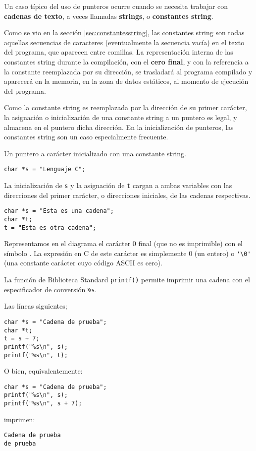 Un caso típico del uso de punteros ocurre cuando se necesita
trabajar con \textbf{cadenas de texto}, a veces llamadas \textbf{strings}, o \textbf{constantes string}. 

Como se vio en la sección \ref{sec:constantesstring}, las constantes string son todas aquellas secuencias de caracteres (eventualmente la secuencia vacía) en el texto del programa, que aparecen entre comillas. La representación interna de las constantes string durante la compilación, con el \textbf{cero final}, y con la referencia a la constante reemplazada por su dirección, se trasladará al programa compilado y aparecerá en la memoria, en la zona de datos estáticos, al momento de ejecución del programa. 

Como la constante string es reemplazada por la dirección de su primer carácter, la asignación o inicialización de una constante string a un puntero es legal, y almacena en el puntero dicha dirección. En la inicialización de punteros, las constantes string son un caso especialmente frecuente.

\begin{ejemplo}
Un puntero a carácter inicializado con una constante string.
\begin{lstlisting}
char *s = "Lenguaje C";
\end{lstlisting}
\end{ejemplo}

\begin{ejemplo}
La inicialización
de \texttt{s} y la asignación de \texttt{t} cargan a ambas variables con las direcciones del primer
carácter, o direcciones iniciales, de las cadenas respectivas.
\begin{lstlisting}
char *s = "Esta es una cadena";
char *t;
t = "Esta es otra cadena";
\end{lstlisting}
\end{ejemplo}

Representamos en el diagrama el carácter 0 final (que no es imprimible) con el
símbolo \textcurrency. La expresión en C de este carácter es simplemente 0 (un entero) o
\lstinline{'\0'} (una constante carácter cuyo código ASCII es cero).

La función de Biblioteca Standard \lstinline{printf()} permite imprimir una cadena con el
especificador de conversión \lstinline{%s}.

\begin{ejemplo}
Las líneas siguientes;
\begin{lstlisting}
char *s = "Cadena de prueba";
char *t;
t = s + 7;
printf("%s\n", s);
printf("%s\n", t);
\end{lstlisting}
O bien, equivalentemente:
\begin{lstlisting}
char *s = "Cadena de prueba";
printf("%s\n", s);
printf("%s\n", s + 7);
\end{lstlisting}

imprimen:
\begin{lstlisting}
Cadena de prueba
de prueba
\end{lstlisting}
\end{ejemplo}

